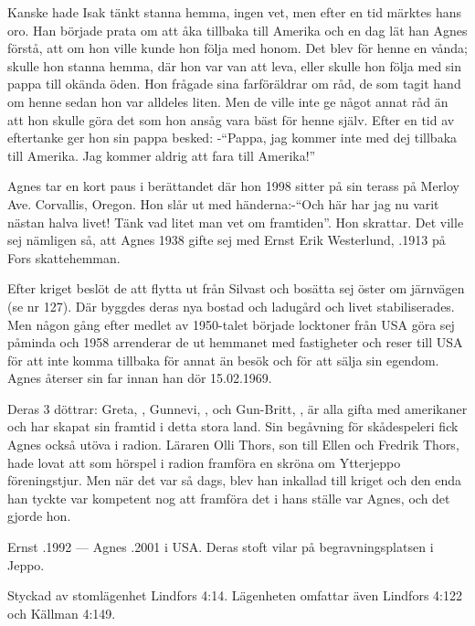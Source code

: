 Kanske hade Isak tänkt stanna hemma, ingen vet, men efter en tid märktes hans oro. Han började prata om att åka tillbaka till Amerika och en dag lät han Agnes förstå, att om hon ville kunde hon följa med honom. Det blev för henne en vånda; skulle hon stanna hemma, där hon var van att leva, eller skulle hon följa med sin pappa till okända öden. Hon frågade sina farföräldrar om råd, de som tagit hand om henne sedan hon var alldeles liten. Men de ville inte ge något annat råd än att hon skulle göra det som hon  ansåg vara bäst för henne själv. Efter en tid av eftertanke ger hon sin pappa besked: -``Pappa, jag kommer inte med dej tillbaka till Amerika. Jag kommer aldrig att fara till Amerika!''

Agnes tar en kort paus i berättandet där hon 1998 sitter på sin terass på Merloy Ave. Corvallis, Oregon. Hon slår ut med händerna:-``Och här har jag nu varit nästan halva livet! Tänk vad litet man vet om framtiden''. Hon skrattar. Det ville sej nämligen så, att Agnes 1938 gifte sej med Ernst Erik Westerlund, .1913 på Fors skattehemman.

Efter kriget beslöt de att flytta ut från Silvast och bosätta sej öster om järnvägen (se nr 127). Där byggdes deras nya bostad och ladugård och livet stabiliserades. Men någon gång efter medlet av 1950-talet började locktoner från USA göra sej påminda och 1958 arrenderar de ut hemmanet med fastigheter och reser till USA för att inte komma tillbaka för annat än besök och för att sälja sin egendom. Agnes återser sin far innan han dör 15.02.1969.

Deras 3 döttrar: Greta, , Gunnevi, , och Gun-Britt, , är alla gifta med amerikaner och har skapat sin framtid i detta stora land. Sin begåvning för skådespeleri fick Agnes också utöva i radion. Läraren Olli Thors, son till Ellen och Fredrik Thors, hade lovat att som hörspel i radion framföra en skröna om Ytterjeppo föreningstjur. Men när det var så dags, blev han inkallad till kriget och den enda han tyckte var kompetent nog att framföra det i hans ställe var Agnes, och det gjorde hon.

Ernst .1992  ---  Agnes .2001 i USA. Deras stoft vilar på begravningsplatsen i Jeppo.



%

Styckad av stomlägenhet Lindfors 4:14. Lägenheten omfattar även Lindfors 4:122 och Källman 4:149.


